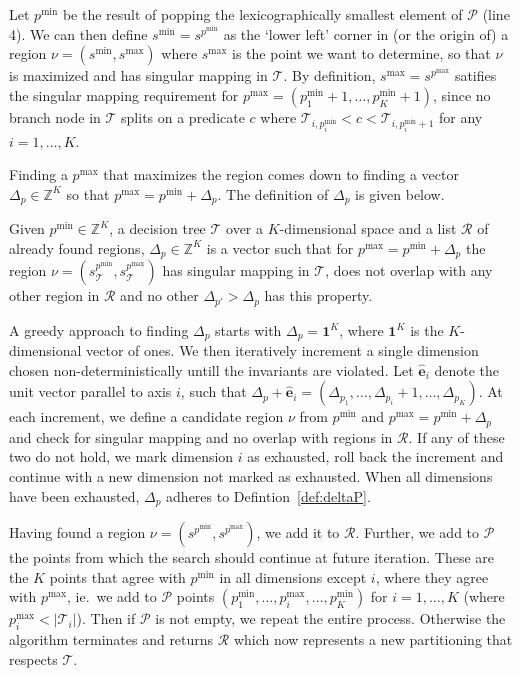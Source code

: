 Let $p^{\min}$ be the result of popping the lexicographically smallest element
of $\mathcal{P}$ (line 4). We can then define $s^{\min} = s^{p^{\min}}$ as the
`lower left' corner in (or the origin of) a region $\nu = (s^{\min}, s^{\max})$
where $s^{\max}$ is the point we want to determine, so that $\nu$ is maximized
and has singular mapping in $\mathcal{T}$. By definition, $s^{\max} =
s^{p^{\max}}$ satifies the singular mapping requirement for $p^{\max} =
(p^{\min}_{1} + 1, \ldots, p^{\min}_{K} + 1)$, since no branch node in
$\mathcal{T}$ splits on a predicate $c$ where $\mathcal{T}_{i,p^{\min}_{i}} < c
< \mathcal{T}_{i,p^{\min}_{i} + 1}$ for any $i = 1, \ldots, K$. 

Finding a $p^{\max}$ that maximizes the region comes down to finding a vector
$\Delta_{p} \in \mathbb{Z}^{K}$ so that $p^{\max} = p^{\min} + \Delta_{p}$. The
definition of $\Delta_{p}$ is given below.

\begin{definition}
    Given $p^{\min} \in \mathbb{Z}^{K}$, a decision tree $\mathcal{T}$ over a
    $K$-dimensional space and a list $\mathcal{R}$ of already found regions,
    $\Delta_{p} \in \mathbb{Z}^{K}$ is a vector such that for $p^{\max} =
    p^{\min} + \Delta_{p}$ the region $\nu = (s^{p^{\min}}_{\mathcal{T}},
    s^{p^{\max}}_{\mathcal{T}})$ has singular mapping in $\mathcal{T}$, does not
    overlap with any other region in $\mathcal{R}$ and no other $\Delta_{p'} >
    \Delta_{p}$ has this property.
\end{definition}\label{def:deltaP}

A greedy approach to finding $\Delta_{p}$ starts with $\Delta_{p} =
\mathbf{1}^{K}$, where $\mathbf{1}^{K}$ is the $K$-dimensional vector of ones.
We then iteratively increment a single dimension chosen non-deterministically
untill the invariants are violated.  Let $\mathbf{\hat{e}}_i$ denote the unit
vector parallel to axis $i$, such that $\Delta_{p} + \mathbf{\hat{e}}_i =
(\Delta_{p_1},\ldots,\Delta_{p_i} + 1,\ldots,\Delta_{p_K})$. At each increment,
we define a candidate region $\nu$ from $p^{\min}$ and $p^{\max} = p^{\min} +
\Delta_{p}$ and check for singular mapping and no overlap with regions in
$\mathcal{R}$. If any of these two do not hold, we mark dimension $i$ as
exhausted, roll back the increment and continue with a new dimension not marked
as exhausted. When all dimensions have been exhausted, $\Delta_{p}$ adheres to
Defintion~\ref{def:deltaP}.

Having found a region $\nu = (s^{p^{\min}}, s^{p^{\max}})$, we add it to
$\mathcal{R}$. Further, we add to $\mathcal{P}$ the points from which the search
should continue at future iteration. These are the $K$ points that agree with
$p^{\min}$ in all dimensions except $i$, where they agree with $p^{\max}$, ie.\
we add to $\mathcal{P}$ points $(p^{\min}_{1}, \ldots, p^{\max}_{i}, \ldots,
p^{\min}_{K})$ for $i = 1,\ldots,K$ (where $p^{\max}_{i} < |\mathcal{T}_{i}|$).
Then if $\mathcal{P}$ is not empty, we repeat the entire process. Otherwise the
algorithm terminates and returns $\mathcal{R}$ which now represents a new
partitioning that respects $\mathcal{T}$.

